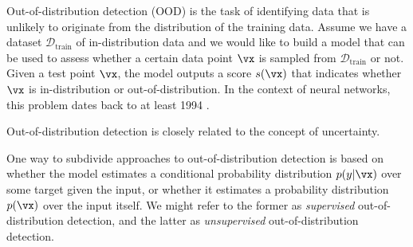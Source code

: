 Out-of-distribution detection (OOD) is the task of identifying data that is unlikely to originate from the distribution of the training data. 
Assume we have a dataset $\mathcal{D}_{\text{train}}$ of in-distribution data and we would like to build a model that can be used to assess whether a certain data point $\vx$ is sampled from $\mathcal{D}_{\text{train}}$ or not. Given a test point $\vx$, the model outputs a score $s(\vx)$ that indicates whether $\vx$ is in-distribution or out-of-distribution. 
In the context of neural networks, this problem dates back to at least 1994 \cite{bishop_novelty_1994}. 

Out-of-distribution detection is closely related to the concept of uncertainty. 

One way to subdivide approaches to out-of-distribution detection is based on whether the model estimates a conditional probability distribution $p(y|\vx)$ over some target given the input, or whether it estimates a probability distribution $p(\vx)$ over the input itself. We might refer to the former as \emph{supervised} out-of-distribution detection, and the latter as \emph{unsupervised} out-of-distribution detection. 






